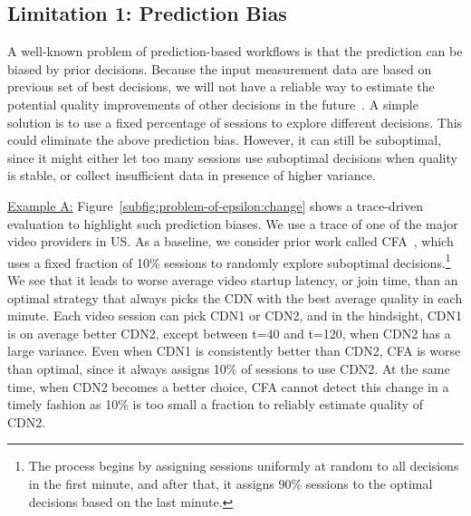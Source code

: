 \subsection{Limitation 1: Prediction Bias}
A well-known problem of prediction-based workflows is that the prediction can be 
biased by prior decisions. Because the input measurement data are based on 
previous set of best decisions, we will 
not have a reliable way to estimate the potential  quality improvements 
of other decisions in the future~\cite{spand}.
A simple solution is to use a fixed percentage of sessions to explore 
different decisions. This could eliminate the above prediction bias.
However, it can still be suboptimal, since it might either let too many sessions  use suboptimal decisions when quality is stable, or collect insufficient data in presence of higher variance.

\smallskip \noindent\underline{Example A:}
Figure~\ref{subfig:problem-of-epsilon:change} shows a trace-driven evaluation to highlight such 
prediction biases. We use a trace of one of the major video providers in US. As a baseline, we consider prior work called CFA~\cite{cfa}, which uses a fixed fraction of 10\% sessions to randomly explore suboptimal decisions.\footnote{The process begins by assigning sessions uniformly at random to all decisions in the first minute, and after that, it assigns 90\% sessions to the optimal decisions based on the last minute.}
 We see that it leads to worse average video startup latency, or join time,
 than an optimal strategy that always picks the CDN with the best average quality in each minute.
Each video session can pick CDN1 or CDN2, and in the hindsight, CDN1 is on average better CDN2, except between t=40 and t=120,
 when CDN2 has a large variance.
 Even when CDN1 is consistently better than CDN2, CFA is worse than optimal, since it always assigns 10\% of sessions to use CDN2. 
 At the same time, when CDN2 becomes a better choice, CFA 
cannot detect this change in a timely fashion 
as  10\% is too small a fraction to reliably estimate quality of CDN2.

